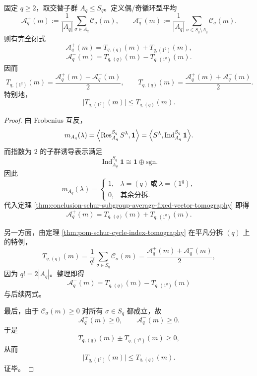 \begin{corollary}[偶置换平均只保留平凡通道与交替通道]\label{cor:conclusion-schur-even-odd-average-trivial-alternating}
固定 \(q\ge 2\)，取交替子群 \(A_q\le S_q\)。定义偶/奇循环型平均
\[
\mathcal A_q^{+}(m):=\frac{1}{|A_q|}\sum_{\sigma\in A_q}\mathcal C_\sigma(m),
\qquad
\mathcal A_q^{-}(m):=\frac{1}{|A_q|}\sum_{\sigma\in S_q\setminus A_q}\mathcal C_\sigma(m).
\]
则有完全闭式
\[
\boxed{\;
\mathcal A_q^{+}(m)=T_{q,(q)}(m)+T_{q,(1^q)}(m),\;}
\]
\[
\boxed{\;
\mathcal A_q^{-}(m)=T_{q,(q)}(m)-T_{q,(1^q)}(m).\;}
\]
因而
\[
\boxed{\;
T_{q,(1^q)}(m)=\frac{\mathcal A_q^{+}(m)-\mathcal A_q^{-}(m)}{2},
\qquad
T_{q,(q)}(m)=\frac{\mathcal A_q^{+}(m)+\mathcal A_q^{-}(m)}{2}.\;}
\]
特别地，
\[
\boxed{\;
\bigl|T_{q,(1^q)}(m)\bigr|\le T_{q,(q)}(m).\;}
\]
\end{corollary}
\begin{proof}
由 Frobenius 互反，
\[
m_{A_q}(\lambda)
=
\Bigl\langle \operatorname{Res}^{S_q}_{A_q}S^\lambda,\mathbf 1\Bigr\rangle
=
\Bigl\langle S^\lambda,\operatorname{Ind}_{A_q}^{S_q}\mathbf 1\Bigr\rangle.
\]
而指数为 \(2\) 的子群诱导表示满足
\[
\operatorname{Ind}_{A_q}^{S_q}\mathbf 1
\cong
\mathbf 1\oplus \mathrm{sgn}.
\]
因此
\[
m_{A_q}(\lambda)=
\begin{cases}
1,& \lambda=(q)\ \text{或}\ \lambda=(1^q),\\[2pt]
0,& \text{其余分拆}.
\end{cases}
\]
代入定理 \ref{thm:conclusion-schur-subgroup-average-fixed-vector-tomography} 即得
\[
\mathcal A_q^{+}(m)=T_{q,(q)}(m)+T_{q,(1^q)}(m).
\]

另一方面，由定理 \ref{thm:pom-schur-cycle-index-tomography} 在平凡分拆 \((q)\) 上的特例，
\[
T_{q,(q)}(m)=\frac{1}{q!}\sum_{\sigma\in S_q}\mathcal C_\sigma(m)
=
\frac{\mathcal A_q^{+}(m)+\mathcal A_q^{-}(m)}{2},
\]
因为 \(q!\!=2|A_q|\)。整理即得
\[
\mathcal A_q^{-}(m)=T_{q,(q)}(m)-T_{q,(1^q)}(m)
\]
与后续两式。

最后，由于 \(\mathcal C_\sigma(m)\ge 0\) 对所有 \(\sigma\in S_q\) 都成立，故
\[
\mathcal A_q^{+}(m)\ge 0,
\qquad
\mathcal A_q^{-}(m)\ge 0.
\]
于是
\[
T_{q,(q)}(m)\pm T_{q,(1^q)}(m)\ge 0,
\]
从而
\[
\bigl|T_{q,(1^q)}(m)\bigr|\le T_{q,(q)}(m).
\]
证毕。
\end{proof}

